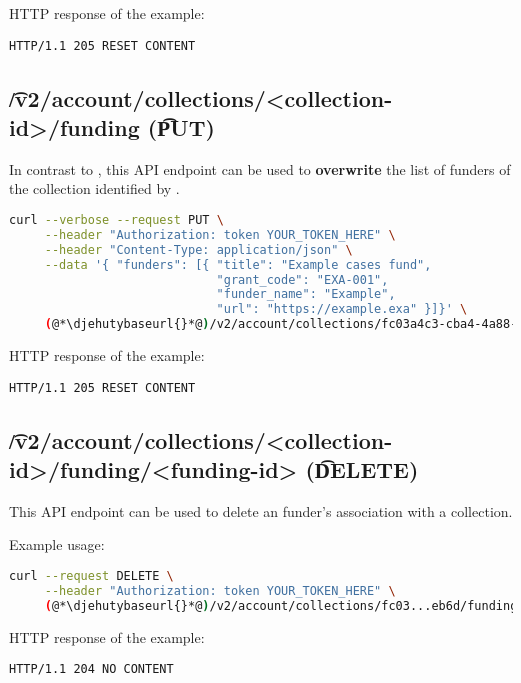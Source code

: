   HTTP response of the example:
\begin{lstlisting}
HTTP/1.1 205 RESET CONTENT
\end{lstlisting}

\subsection{\t{/v2/account/collections/<collection-id>/funding} (\t{PUT})}

  In contrast to , this API endpoint
  can be used to \textbf{overwrite} the list of funders of the collection
  identified by .

\begin{lstlisting}[language=bash]
curl --verbose --request PUT \
     --header "Authorization: token YOUR_TOKEN_HERE" \
     --header "Content-Type: application/json" \
     --data '{ "funders": [{ "title": "Example cases fund",
                             "grant_code": "EXA-001",
                             "funder_name": "Example",
                             "url": "https://example.exa" }]}' \
     (@*\djehutybaseurl{}*@)/v2/account/collections/fc03a4c3-cba4-4a88-a8a6-eb38924eeb6d/funding
\end{lstlisting}

  HTTP response of the example:
\begin{lstlisting}
HTTP/1.1 205 RESET CONTENT
\end{lstlisting}

\subsection{\t{/v2/account/collections/<collection-id>/funding/<funding-id>} (\t{DELETE})}

  This API endpoint can be used to delete an funder's association with a collection.

  Example usage:
\begin{lstlisting}[language=bash]
curl --request DELETE \
     --header "Authorization: token YOUR_TOKEN_HERE" \
     (@*\djehutybaseurl{}*@)/v2/account/collections/fc03...eb6d/funding/9b43...e6cd
\end{lstlisting}

  HTTP response of the example:
\begin{lstlisting}
HTTP/1.1 204 NO CONTENT
\end{lstlisting}
